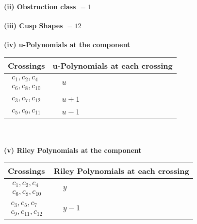 \documentclass[1p]{elsarticle_modified}
\theoremstyle{definition}
\begin{document}
\flushleft \textbf{(ii) Obstruction class $= 1$}\\~\\
\flushleft \textbf{(iii) Cusp Shapes $= 12$}\\~\\
\newpage\renewcommand{\arraystretch}{1}
\flushleft \textbf{(iv) u-Polynomials at the component}\newline \\
\begin{tabular}{m{50pt}|m{274pt}}
Crossings & \hspace{64pt}u-Polynomials at each crossing \\
\hline $$\begin{aligned}c_{1},c_{2},c_{4}\\c_{6},c_{8},c_{10}\end{aligned}$$&$\begin{aligned}
&u
\end{aligned}$\\
\hline $$\begin{aligned}c_{3},c_{7},c_{12}\end{aligned}$$&$\begin{aligned}
&u+1
\end{aligned}$\\
\hline $$\begin{aligned}c_{5},c_{9},c_{11}\end{aligned}$$&$\begin{aligned}
&u-1
\end{aligned}$\\
\hline
\end{tabular}\\~\\
\newpage\renewcommand{\arraystretch}{1}
\flushleft \textbf{(v) Riley Polynomials at the component}\newline \\
\begin{tabular}{m{50pt}|m{274pt}}
Crossings & \hspace{64pt}Riley Polynomials at each crossing \\
\hline $$\begin{aligned}c_{1},c_{2},c_{4}\\c_{6},c_{8},c_{10}\end{aligned}$$&$\begin{aligned}
&y
\end{aligned}$\\
\hline $$\begin{aligned}c_{3},c_{5},c_{7}\\c_{9},c_{11},c_{12}\end{aligned}$$&$\begin{aligned}
&y-1
\end{aligned}$\\
\hline
\end{tabular}\\~\\
\end{document}
